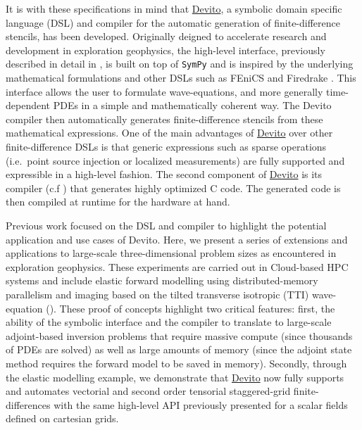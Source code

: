 \documentclass[conference]{IEEEtran}
\begin{document}
It is with these specifications in mind that
\href{https://github.com/devitocodes/devito}{Devito}, a symbolic domain
specific language (DSL) and compiler for the automatic generation of
finite-difference stencils, has been developed. Originally deigned to
accelerate research and development in exploration geophysics, the high-level
interface, previously described in detail in \cite{devito-api}, is built on top
of \texttt{SymPy} \cite{sympy} and is inspired by the underlying mathematical
formulations and other DSLs such as FEniCS \cite{fenics} and Firedrake
\cite{firedrake}. This interface allows the user to formulate wave-equations,
and more generally time-dependent PDEs in a simple and mathematically coherent
way. The Devito compiler then automatically generates finite-difference
stencils from these mathematical expressions. One of the main advantages of
\href{https://github.com/devitocodes/devito}{Devito} over other
finite-difference DSLs is that generic expressions such as sparse operations
(i.e.~point source injection or localized measurements) are fully supported and
expressible in a high-level fashion. The second component of
\href{https://github.com/devitocodes/devito}{Devito} is its compiler (c.f
\cite{devito-compiler}) that generates highly optimized C code. The generated
code is then compiled at runtime for the hardware at hand.

Previous work focused on the DSL and compiler to highlight the potential
application and use cases of Devito. Here, we present a series of
extensions and applications to large-scale three-dimensional problem
sizes as encountered in exploration geophysics. These experiments are
carried out in Cloud-based HPC systems and include elastic forward
modelling using distributed-memory parallelism and imaging based on the
tilted transverse isotropic (TTI) wave-equation
(\cite{virieux, thomsen1986, zhang-tti, duveneck, louboutin2018segeow}).
These proof of concepts highlight two critical features: first, the
ability of the symbolic interface and the compiler to translate to
large-scale adjoint-based inversion problems that require massive
compute (since thousands of PDEs are solved) as well as large amounts of
memory (since the adjoint state method requires the forward model to be
saved in memory). Secondly, through the elastic modelling example, we
demonstrate that \href{https://github.com/devitocodes/devito}{Devito}
now fully supports and automates vectorial and second order tensorial
staggered-grid finite-differences with the same high-level API
previously presented for a scalar fields defined on cartesian grids.
\end{document}
